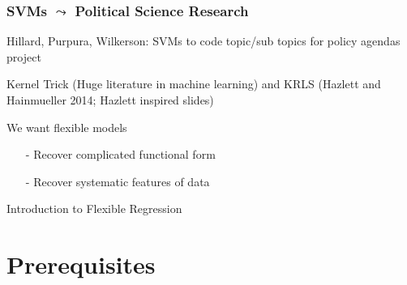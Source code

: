 \documentclass{beamer}
\numberwithin{equation}{section}
\begin{document}
\begin{frame}
\frametitle{SVMs $\leadsto$ Political Science Research} 

Hillard, Purpura, Wilkerson: SVMs to code topic/sub topics for policy agendas project



\end{frame}



\begin{frame}

\huge 
Kernel Trick (Huge literature in machine learning) and KRLS (Hazlett and Hainmueller 2014; Hazlett inspired slides)

\end{frame}


\begin{frame}

We want \alert{flexible} models

\begin{itemize}
\item[-] Recover complicated functional form
\item[-] Recover systematic features of data
\end{itemize}

\alert{Introduction to Flexible Regression}




\end{frame}




\section{Prerequisites}
\end{document}
